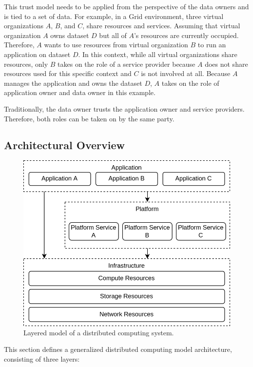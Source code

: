 This trust model needs to be applied from the perspective of the data owners and
is tied to a set of data. For example, in a Grid environment, three virtual
organizations $A$, $B$, and $C$, share resources and services. Assuming that
virtual organization $A$ owns dataset $D$ but all of $A$'s resources are
currently occupied. Therefore, $A$ wants to use resources from virtual
organization $B$ to run an application on dataset $D$. In this context, while
all virtual organizations share resources, only $B$ takes on the role of a
service provider because $A$ does not share resources used for this specific
context and $C$ is not involved at all. Because $A$ manages the application and
owns the dataset $D$, $A$ takes on the role of application owner and data owner
in this example.

Traditionally, the data owner trusts the application owner and service
providers. Therefore, both roles can be taken on by the same party.

\subsection{Architectural Overview}
\label{sec:traditional-architecture-overview}

\begin{figure}[H]
  \centering
  \includegraphics[width=0.7\linewidth]{resources/distributed-computing-overview.drawio.png}
  \caption{Layered model of a distributed computing system.}
\end{figure}

This section defines a generalized distributed computing model architecture,
consisting of three layers:

